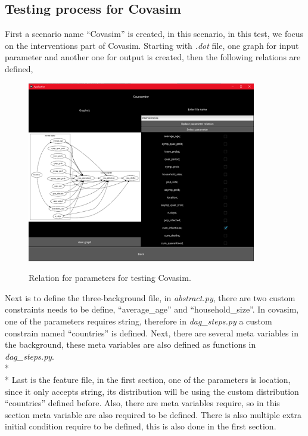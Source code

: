 \subsection{Testing process for Covasim}
First a scenario name “Covasim” is created, in this scenario, in this test, we focus on the interventions part of Covasim. Starting with \textsl{.dot} file, one graph for input parameter and another one for output is created, then the following relations are defined,
\begin{figure}[H]
	\centering
	\includegraphics[width=10cm]{figures/CovasimTestProcess2.png}\\
	\caption{Relation for parameters for testing Covasim.}
	\label{fig:figure35}
\end{figure}
\noindent 
Next is to define the three-background file, in \textsl{abstract.py}, there are two custom constraints needs to be define, “average\_age” and “household\_size”. In covasim, one of the parameters requires string, therefore in \textsl{dag\_steps.py} a custom constrain named “countries” is defined. Next, there are several meta variables in the background, these meta variables are also defined as functions in \textsl{dag\_steps.py}. \\*\\*
Last is the feature file, in the first section, one of the parameters is location, since it only accepts string, its distribution will be using the custom distribution “countries” defined before. Also, there are meta variables require, so in this section meta variable are also required to be defined. There is also multiple extra initial condition require to be defined, this is also done in the first section.
